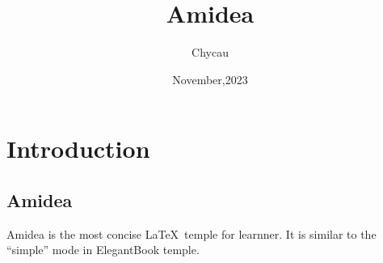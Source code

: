 \documentclass[black]{amidea}
\title{Amidea}
\subtitle{}
\author{Chycau}
\date{November,2023}
\begin{document}
\maketitle

\chapter{Introduction}
\section{Amidea}
Amidea is the most concise \LaTeX\ temple for learnner. It is similar to the ``simple'' mode in ElegantBook temple.
\end{document}
